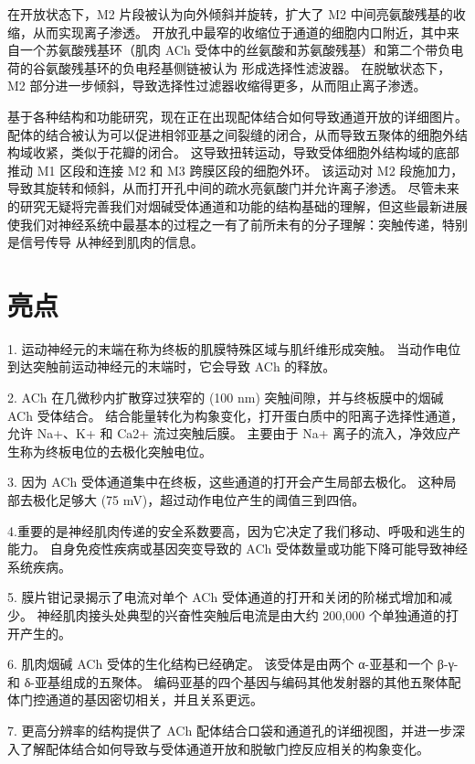 在开放状态下，M2 片段被认为向外倾斜并旋转，扩大了 M2 中间亮氨酸残基的收缩，从而实现离子渗透。 
开放孔中最窄的收缩位于通道的细胞内口附近，其中来自一个苏氨酸残基环（肌肉 ACh 受体中的丝氨酸和苏氨酸残基）和第二个带负电荷的谷氨酸残基环的负电羟基侧链被认为 形成选择性滤波器。 
在脱敏状态下，M2 部分进一步倾斜，导致选择性过滤器收缩得更多，从而阻止离子渗透。


基于各种结构和功能研究，现在正在出现配体结合如何导致通道开放的详细图片。 
配体的结合被认为可以促进相邻亚基之间裂缝的闭合，从而导致五聚体的细胞外结构域收紧，类似于花瓣的闭合。 
这导致扭转运动，导致受体细胞外结构域的底部推动 M1 区段和连接 M2 和 M3 跨膜区段的细胞外环。 
该运动对 M2 段施加力，导致其旋转和倾斜，从而打开孔中间的疏水亮氨酸门并允许离子渗透。 
尽管未来的研究无疑将完善我们对烟碱受体通道和功能的结构基础的理解，但这些最新进展使我们对神经系统中最基本的过程之一有了前所未有的分子理解：突触传递，特别是信号传导 从神经到肌肉的信息。



\section{亮点}

1. 运动神经元的末端在称为终板的肌膜特殊区域与肌纤维形成突触。 
当动作电位到达突触前运动神经元的末端时，它会导致 ACh 的释放。 


2. ACh 在几微秒内扩散穿过狭窄的 (100 nm) 突触间隙，并与终板膜中的烟碱 ACh 受体结合。 
结合能量转化为构象变化，打开蛋白质中的阳离子选择性通道，允许 Na+、K+ 和 Ca2+ 流过突触后膜。 
主要由于 Na+ 离子的流入，净效应产生称为终板电位的去极化突触电位。 


3. 因为 ACh 受体通道集中在终板，这些通道的打开会产生局部去极化。 
这种局部去极化足够大 (75 mV)，超过动作电位产生的阈值三到四倍。 


4.重要的是神经肌肉传递的安全系数要高，因为它决定了我们移动、呼吸和逃生的能力。 
自身免疫性疾病或基因突变导致的 ACh 受体数量或功能下降可能导致神经系统疾病。 


5. 膜片钳记录揭示了电流对单个 ACh 受体通道的打开和关闭的阶梯式增加和减少。 
神经肌肉接头处典型的兴奋性突触后电流是由大约 200,000 个单独通道的打开产生的。 


6. 肌肉烟碱 ACh 受体的生化结构已经确定。 
该受体是由两个 α-亚基和一个 β-γ-和 δ-亚基组成的五聚体。 
编码亚基的四个基因与编码其他发射器的其他五聚体配体门控通道的基因密切相关，并且关系更远。 


7. 更高分辨率的结构提供了 ACh 配体结合口袋和通道孔的详细视图，并进一步深入了解配体结合如何导致与受体通道开放和脱敏门控反应相关的构象变化。


